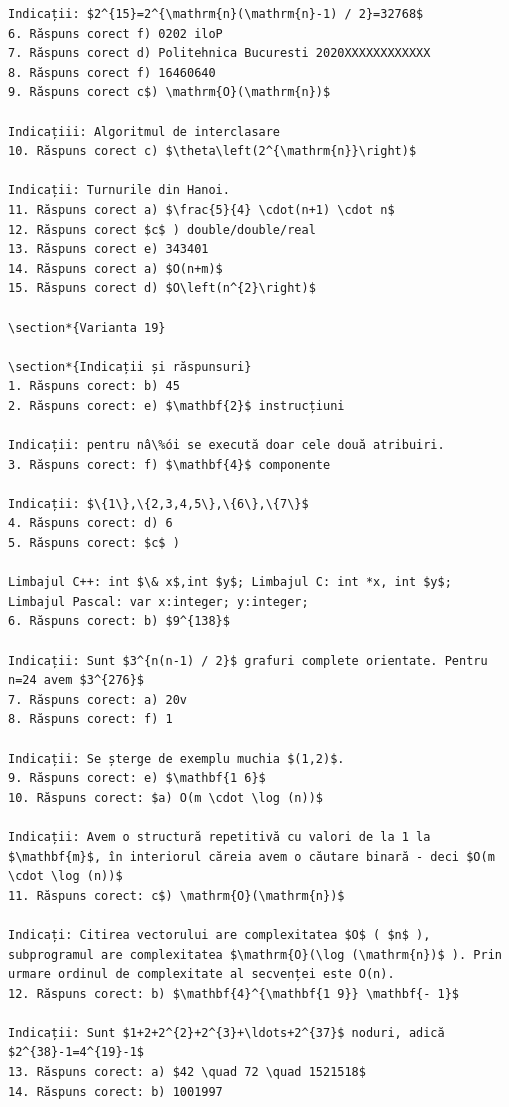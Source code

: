 \documentclass[10pt]{article}
\begin{document}
\begin{verbatim}
Indicații: $2^{15}=2^{\mathrm{n}(\mathrm{n}-1) / 2}=32768$
6. Răspuns corect f) 0202 iloP
7. Răspuns corect d) Politehnica Bucuresti 2020XXXXXXXXXXXX
8. Răspuns corect f) 16460640
9. Răspuns corect c$) \mathrm{O}(\mathrm{n})$

Indicațiii: Algoritmul de interclasare
10. Răspuns corect c) $\theta\left(2^{\mathrm{n}}\right)$

Indicații: Turnurile din Hanoi.
11. Răspuns corect a) $\frac{5}{4} \cdot(n+1) \cdot n$
12. Răspuns corect $c$ ) double/double/real
13. Răspuns corect e) 343401
14. Răspuns corect a) $O(n+m)$
15. Răspuns corect d) $O\left(n^{2}\right)$

\section*{Varianta 19}

\section*{Indicații și răspunsuri}
1. Răspuns corect: b) 45
2. Răspuns corect: e) $\mathbf{2}$ instrucțiuni

Indicații: pentru nâ\%ói se execută doar cele două atribuiri.
3. Răspuns corect: f) $\mathbf{4}$ componente

Indicații: $\{1\},\{2,3,4,5\},\{6\},\{7\}$
4. Răspuns corect: d) 6
5. Răspuns corect: $c$ )

Limbajul C++: int $\& x$,int $y$; Limbajul C: int *x, int $y$;
Limbajul Pascal: var x:integer; y:integer;
6. Răspuns corect: b) $9^{138}$

Indicații: Sunt $3^{n(n-1) / 2}$ grafuri complete orientate. Pentru n=24 avem $3^{276}$
7. Răspuns corect: a) 20v
8. Răspuns corect: f) 1

Indicații: Se șterge de exemplu muchia $(1,2)$.
9. Răspuns corect: e) $\mathbf{1 6}$
10. Răspuns corect: $a) O(m \cdot \log (n))$

Indicații: Avem o structură repetitivă cu valori de la 1 la $\mathbf{m}$, în interiorul căreia avem o căutare binară - deci $O(m \cdot \log (n))$
11. Răspuns corect: c$) \mathrm{O}(\mathrm{n})$

Indicați: Citirea vectorului are complexitatea $O$ ( $n$ ), subprogramul are complexitatea $\mathrm{O}(\log (\mathrm{n})$ ). Prin urmare ordinul de complexitate al secvenței este O(n).
12. Răspuns corect: b) $\mathbf{4}^{\mathbf{1 9}} \mathbf{- 1}$

Indicații: Sunt $1+2+2^{2}+2^{3}+\ldots+2^{37}$ noduri, adică $2^{38}-1=4^{19}-1$
13. Răspuns corect: a) $42 \quad 72 \quad 1521518$
14. Răspuns corect: b) 1001997


\end{verbatim}
\end{document}
